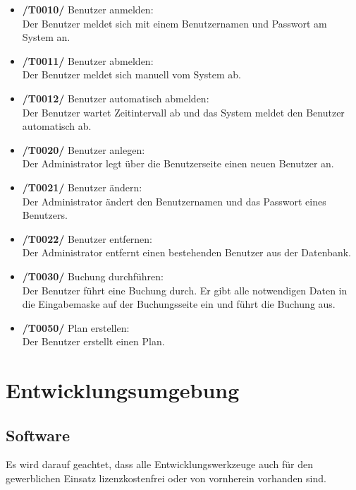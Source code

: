 \documentclass[a4paper,oneside]{scrreprt}
\begin{document}
\begin{itemize}
\item \textbf{/T0010/} Benutzer anmelden: \\
Der Benutzer meldet sich mit einem Benutzernamen und Passwort am System an.

\item \textbf{/T0011/} Benutzer abmelden: \\
Der Benutzer meldet sich manuell vom System ab.

\item \textbf{/T0012/} Benutzer automatisch abmelden: \\
Der Benutzer wartet Zeitintervall ab und das System meldet den Benutzer automatisch ab.

\item \textbf{/T0020/} Benutzer anlegen: \\
Der Administrator legt über die Benutzerseite einen neuen Benutzer an.

\item \textbf{/T0021/} Benutzer ändern: \\
Der Administrator ändert den Benutzernamen und das Passwort eines Benutzers.

\item \textbf{/T0022/} Benutzer entfernen: \\
Der Administrator entfernt einen bestehenden Benutzer aus der Datenbank.

\item \textbf{/T0030/} Buchung durchführen: \\
Der Benutzer führt eine Buchung durch. Er gibt alle notwendigen Daten in die Eingabemaske auf der Buchungsseite ein und führt die Buchung aus.

\item \textbf{/T0050/} Plan erstellen: \\
Der Benutzer erstellt einen Plan.
\end{itemize}


\chapter{Entwicklungsumgebung}

\section{Software}

Es wird darauf geachtet, dass alle Entwicklungswerkzeuge auch für den gewerblichen Einsatz lizenzkostenfrei oder von vornherein vorhanden sind.
\end{document}
